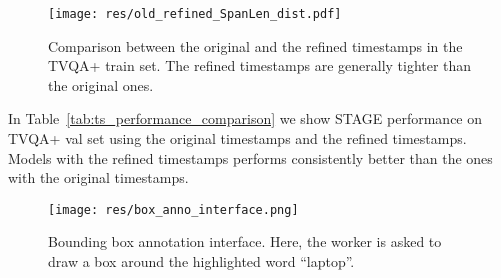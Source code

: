 \documentclass[11pt,a4paper]{article}
\begin{document}
\begin{figure}[ht]
  \centering
  \texttt{[image: res/old\_refined\_SpanLen\_dist.pdf]}
  \caption{Comparison between the original and the refined timestamps in the TVQA+ train set. The refined timestamps are generally tighter than the original ones.}
  \label{fig:original_old_ts}
\end{figure} 


In Table~\ref{tab:ts_performance_comparison} we show STAGE performance on TVQA+ val set using the original timestamps and the refined timestamps. Models with the refined timestamps performs consistently better than the ones with the original timestamps. 


\begin{table}[ht]
\centering
\small
{}
\caption{STAGE performance comparison between the original timestamps and the refined timestamps on TVQA+ val set. \textit{Each row adds an extra component to the row above it.}}
\label{tab:ts_performance_comparison}
\end{table}


\begin{figure}[t]
  \centering
  \texttt{[image: res/box\_anno\_interface.png]}
  \caption{Bounding box annotation interface. Here, the worker is asked to draw a box around the highlighted word ``laptop''.}
  \label{fig:box_anno}
\end{figure} 
\end{document}
